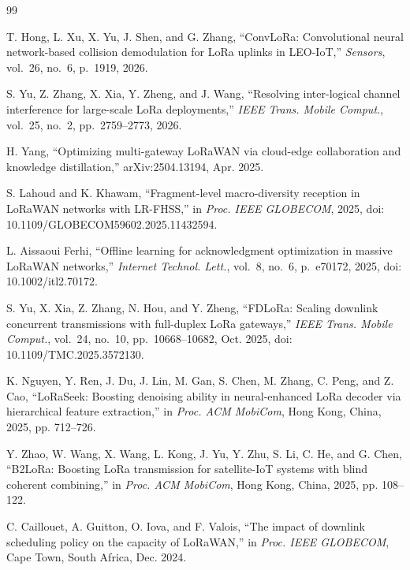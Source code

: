 \documentclass[journal]{IEEEtran}
\begin{document}

 

\begin{thebibliography}{99}


T. Hong, L. Xu, X. Yu, J. Shen, and G. Zhang, ``ConvLoRa: Convolutional neural
network-based collision demodulation for LoRa uplinks in LEO-IoT,''
\emph{Sensors}, vol.~26, no.~6, p.~1919, 2026.


S. Yu, Z. Zhang, X. Xia, Y. Zheng, and J. Wang, ``Resolving inter-logical channel interference for large-scale LoRa deployments,'' \emph{IEEE Trans. Mobile Comput.}, vol.\ 25, no.\ 2, pp.\ 2759--2773, 2026.


H. Yang, ``Optimizing multi-gateway LoRaWAN via cloud-edge collaboration and
knowledge distillation,'' arXiv:2504.13194, Apr. 2025.


S. Lahoud and K. Khawam, ``Fragment-level macro-diversity reception in LoRaWAN networks with LR-FHSS,'' in \emph{Proc. IEEE GLOBECOM}, 2025, doi: 10.1109/GLOBECOM59602.2025.11432594.


L. Aissaoui Ferhi, ``Offline learning for acknowledgment optimization in massive LoRaWAN networks,'' \emph{Internet Technol. Lett.}, vol.\ 8, no.\ 6, p.\ e70172, 2025, doi: 10.1002/itl2.70172.


S. Yu, X. Xia, Z. Zhang, N. Hou, and Y. Zheng, ``FDLoRa: Scaling downlink concurrent transmissions with full-duplex LoRa gateways,'' \emph{IEEE Trans. Mobile Comput.}, vol.\ 24, no.\ 10, pp.\ 10668--10682, Oct. 2025, doi: 10.1109/TMC.2025.3572130.


K. Nguyen, Y. Ren, J. Du, J. Lin, M. Gan, S. Chen, M. Zhang, C. Peng, and
Z. Cao, ``LoRaSeek: Boosting denoising ability in neural-enhanced LoRa decoder
via hierarchical feature extraction,'' in \emph{Proc. ACM MobiCom}, Hong Kong,
China, 2025, pp. 712--726.


Y. Zhao, W. Wang, X. Wang, L. Kong, J. Yu, Y. Zhu, S. Li, C. He, and G. Chen,
``B2LoRa: Boosting LoRa transmission for satellite-IoT systems with blind
coherent combining,'' in \emph{Proc. ACM MobiCom}, Hong Kong, China, 2025,
pp. 108--122.


C. Caillouet, A. Guitton, O. Iova, and F. Valois, ``The impact of downlink
scheduling policy on the capacity of LoRaWAN,'' in \emph{Proc. IEEE GLOBECOM},
Cape Town, South Africa, Dec. 2024.



\end{thebibliography}
\end{document}

